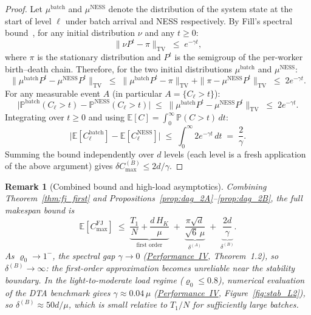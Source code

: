 \documentclass[11pt,a4paper]{report}
\newtheorem{remark}{Remark}[section]
\begin{document}
\begin{proof}
Let $\mu^{\mathrm{batch}}$ and $\mu^{\mathrm{NESS}}$ denote the
distribution of the system state at the start of level $\ell$ under
batch arrival and NESS respectively.
By Fill's spectral bound~\cite{fill1991}, for any initial distribution
$\nu$ and any $t \geq 0$:
\[
  \|\nu P^t - \pi\|_{\mathrm{TV}} \;\leq\; e^{-\gamma t},
\]
where $\pi$ is the stationary distribution and $P^t$ is the semigroup
of the per-worker birth--death chain.
Therefore, for the two initial distributions $\mu^{\mathrm{batch}}$
and $\mu^{\mathrm{NESS}}$:
\[
  \|\mu^{\mathrm{batch}} P^t - \mu^{\mathrm{NESS}} P^t\|_{\mathrm{TV}}
  \;\leq\;
  \|\mu^{\mathrm{batch}} P^t - \pi\|_{\mathrm{TV}}
  + \|\pi - \mu^{\mathrm{NESS}} P^t\|_{\mathrm{TV}}
  \;\leq\; 2e^{-\gamma t}.
\]
For any measurable event $A$ (in particular $A = \{C_\ell > t\}$):
\[
  \bigl|
    \mathbb{P}^{\mathrm{batch}}(C_\ell > t)
    - \mathbb{P}^{\mathrm{NESS}}(C_\ell > t)
  \bigr|
  \;\leq\;
  \|\mu^{\mathrm{batch}} P^t - \mu^{\mathrm{NESS}} P^t\|_{\mathrm{TV}}
  \;\leq\; 2e^{-\gamma t}.
\]
Integrating over $t \geq 0$ and using
$\mathbb{E}[C] = \int_0^\infty \mathbb{P}(C > t)\,dt$:
\[
  \bigl|\mathbb{E}[C_\ell^{\mathrm{batch}}]
  - \mathbb{E}[C_\ell^{\mathrm{NESS}}]\bigr|
  \;\leq\;
  \int_0^\infty 2e^{-\gamma t}\,dt
  \;=\; \frac{2}{\gamma}.
\]
Summing the bound independently over $d$ levels (each level is a
fresh application of the above argument) gives $\delta C_{\max}^{(B)} \leq 2d/\gamma$.
\end{proof}

\begin{remark}[Combined bound and high-load asymptotics]
\label{rem:dag_combined}
Combining Theorem~\ref{thm:fj_first} and
Propositions~\ref{prop:dag_2A}--\ref{prop:dag_2B},
the full makespan bound is
\begin{equation}\label{eq:fj_full}
  \mathbb{E}[C_{\max}^{\mathrm{FJ}}]
  \;\leq\;
  \underbrace{\frac{T_1}{N} + \frac{d\,H_K}{\mu}}_{\text{first order}}
  \;+\;
  \underbrace{\frac{\pi\sqrt{d}}{\sqrt{6}\,\mu}}_{\delta^{(A)}}
  \;+\;
  \underbrace{\frac{2d}{\gamma}}_{\delta^{(B)}}.
\end{equation}
As $\varrho_0 \to 1^-$, the spectral gap $\gamma \to 0$
(\hyperref[chap:stability]{Performance~IV}, Theorem~1.2),
so $\delta^{(B)} \to \infty$: the first-order approximation
becomes unreliable near the stability boundary.
In the light-to-moderate load regime ($\varrho_0 \leq 0.8$),
numerical evaluation of the DTA benchmark gives
$\gamma \approx 0.04\,\mu$ (\hyperref[chap:stability]{Performance~IV},
Figure~\ref{fig:stab_L2}), so $\delta^{(B)} \approx 50d/\mu$, which is
small relative to $T_1/N$ for sufficiently large batches.
\end{remark}
\end{document}
